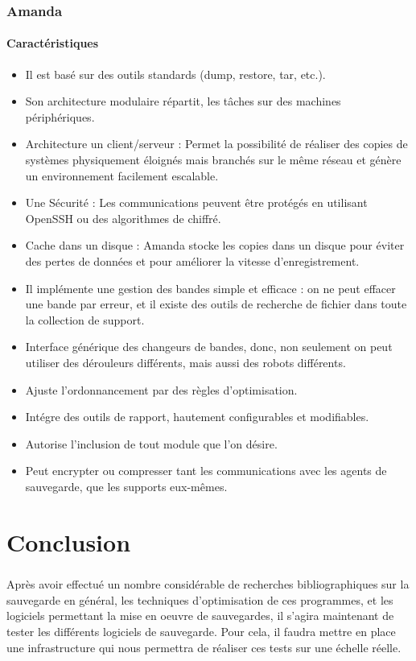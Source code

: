 \documentclass[a4paper,11pt]{report}
\begin{document}
\subsection{Amanda}
\subsubsection{Caractéristiques}
\begin{itemize}
  \item Il est basé sur des outils standards (dump, restore, tar, etc.).
  \item Son architecture modulaire répartit, les tâches sur des machines périphériques.
  \item Architecture un client/serveur : Permet la possibilité de réaliser des copies de systèmes physiquement éloignés mais branchés sur le même réseau et génère un environnement facilement escalable.
  \item Une Sécurité : Les communications peuvent être protégés en utilisant OpenSSH ou des algorithmes de chiffré.
  \item Cache dans un disque : Amanda stocke les copies dans un disque pour éviter des pertes de données et pour améliorer la vitesse d'enregistrement.
  \item Il implémente une gestion des bandes simple et efficace : on ne peut effacer une bande par erreur, et il existe des outils de recherche de fichier dans toute la collection de support.
  \item Interface générique des changeurs de bandes, donc, non seulement on peut utiliser des dérouleurs différents, mais aussi des robots différents.
  \item Ajuste l’ordonnancement par des règles d’optimisation.
  \item Intégre des outils de rapport, hautement configurables et modifiables.
  \item Autorise l’inclusion de tout module que l’on désire.
  \item Peut encrypter ou compresser tant les communications avec les agents de sauvegarde, que les supports eux-mêmes.
\end{itemize}

\chapter{Conclusion}

\paragraph{}
Après avoir effectué un nombre considérable de recherches bibliographiques sur la sauvegarde en général, les techniques d'optimisation de ces programmes, et les logiciels permettant la mise en oeuvre de sauvegardes, il s'agira maintenant de tester les différents logiciels de sauvegarde.
Pour cela, il faudra mettre en place une infrastructure qui nous permettra de réaliser ces tests sur une échelle réelle.
\end{document}
